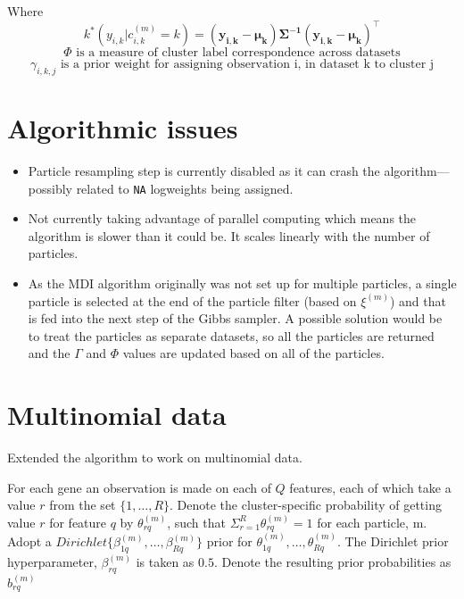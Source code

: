 \documentclass[10pt,a4paper]{article}
\begin{document}
Where
\begin{equation}
\label{eq:likelihood}
k^*(y_{i, k}|c_{i, k}^{(m)} = k) = (\mathbf{y_{i, k}} - \mathbf{\mu_k}) \mathbf{\Sigma^{-1}} (\mathbf{y_{i, k}} - \mathbf{\mu_k})^\top
\end{equation}
\begin{equation}
\label{eq:phi}
\Phi \text{ is a measure of cluster label correspondence across datasets}
\end{equation}
\begin{equation}
\label{eq:gamma}
\gamma_{i, k, j} \text{ is a prior weight for assigning observation i, in dataset k to cluster j}
\end{equation}


\section{Algorithmic issues}
\begin{itemize}
\item Particle resampling step is currently disabled as it can crash the algorithm---possibly related to \texttt{NA} logweights being assigned.
\item Not currently taking advantage of parallel computing which means the algorithm is slower than it could be. It scales linearly with the number of particles.
\item As the MDI algorithm originally was not set up for multiple particles, a single particle is selected at the end of the particle filter (based on $\xi^{(m)}$) and that is fed into the next step of the Gibbs sampler. A possible solution would be to treat the particles as separate datasets, so all the particles are returned and the $\Gamma$ and $\Phi$ values are updated based on all of the particles.
\end{itemize}


\section{Multinomial data}
Extended the algorithm to work on multinomial data.

For each gene an observation is made on each of $Q$ features, each of which take a value $r$ from the set $\{1, \dots, R\}$. Denote the cluster-specific probability of getting value $r$ for feature $q$ by $\theta_{rq}^{(m)}$, such that $\Sigma_{r = 1}^{R} \theta_{rq}^{(m)} = 1$ for each particle, m. Adopt a $Dirichlet\{\beta_{1q}^{(m)}, \dots, \beta_{Rq}^{(m)}\}$ prior for $\theta_{1q}^{(m)}, \dots, \theta_{Rq}^{(m)}$. The Dirichlet prior hyperparameter, $\beta_{rq}^{(m)}$ is taken as $0.5$. Denote the resulting prior probabilities as $b_{rq}^{(m)}$
\end{document}
